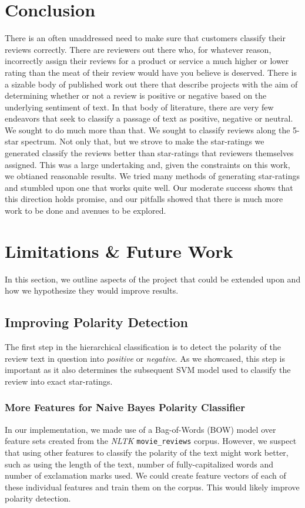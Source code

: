 \documentclass[11pt]{report} %
\begin{document}
\section{Conclusion}
There is an often unaddressed need to make sure that customers classify their reviews correctly. There are reviewers out there who, for whatever reason, incorrectly assign their reviews for a product or service a much higher or lower rating than the meat of their review would have you believe is deserved. There is a sizable body of published work out there that describe projects with the aim of determining whether or not a review is positive or negative based on the underlying sentiment of text. In that body of literature, there are very few endeavors that seek to classify a passage of text as positive, negative or neutral. We sought to do much more than that. We sought to classify reviews along the 5-star spectrum. Not only that, but we strove to make the star-ratings we generated classify the reviews better than star-ratings that reviewers themselves assigned. This was a large undertaking and, given the constraints on this work, we obtianed reasonable results. We tried many methods of generating star-ratings and stumbled upon one that works quite well. Our moderate success shows that this direction holds promise, and our pitfalls showed that there is much more work to be done and avenues to be explored. 

\section{Limitations \& Future Work}
In this section, we outline aspects of the project that could be extended upon and how we hypothesize they would improve results. 
\subsection{Improving Polarity Detection}
The first step in the hierarchical classification is to detect the polarity of the review text in question into \textit{positive} or \textit{negative}. As we showcased, this step is important as it also determines the subsequent SVM model used to classify the review into exact star-ratings.
\subsubsection{More Features for Naive Bayes Polarity Classifier}
 In our implementation, we made use of a Bag-of-Words (BOW) model over feature sets created from the \textit{NLTK} \verb|movie_reviews| corpus. However, we suspect that using other features to classify the polarity of the text might work better, such as using the length of the text, number of fully-capitalized words and number of exclamation marks used. We could create feature vectors of each of these individual features and train them on the corpus. This would likely improve polarity detection.
\end{document}
